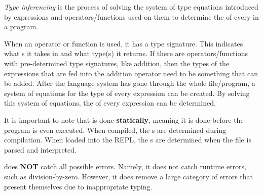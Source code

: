 \begin{definition}\label{def:Type_Inferencing}
  \emph{Type inferencing} is the process of solving the system of type equations introduced by expressions and operators/functions used on them to determine the  of every  in a program.

  When an operator or function is used, it has a type signature.
  This indicates what s it takes in and what type(s) it returns.
  If there are operators/functions with pre-determined type signatures, like addition, then the types of the expressions that are fed into the addition operator need to be something that can be added.
  After the language system has gone through the whole file/program, a system of equations for the type of every expression can be created.
  By solving this system of equations, the  of every expression can be determined.

  \begin{remark}\label{rmk:Type_Inferencing_Static}
    It is important to note that  is done \textbf{statically}, meaning it is done before the program is even executed.
    When compiled, the s are determined during compilation.
    When loaded into the REPL, the s are determined when the file is parsed and interpreted.
  \end{remark}

  \begin{remark}
     does \textbf{NOT} catch all possible errors.
    Namely, it does not catch runtime errors, such as division-by-zero.
    However, it does remove a large category of errors that present themselves due to inappropriate typing.
  \end{remark}
\end{definition}


